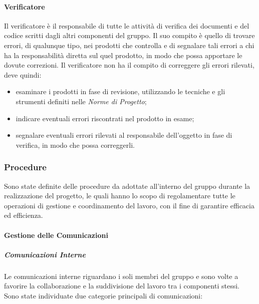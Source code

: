 		\paragraph{Verificatore}
		
			Il verificatore è il responsabile di tutte le attività di verifica dei documenti e del codice scritti dagli altri componenti del gruppo. Il suo compito è quello di trovare errori, di qualunque tipo, nei prodotti che controlla e di segnalare tali errori a chi ha la responsabilità diretta sul quel prodotto, in modo che possa apportare le dovute correzioni.
			\newline
			Il verificatore non ha il compito di correggere gli errori rilevati, deve quindi:
			
			\begin{itemize}
				\item esaminare i prodotti in fase di revisione, utilizzando le tecniche e gli strumenti definiti nelle \textit{Norme di Progetto};
				\item indicare eventuali errori riscontrati nel prodotto in esame;
				\item segnalare eventuali errori rilevati al responsabile dell'oggetto in fase di verifica, in modo che possa correggerli.
			\end{itemize}	
	
	\subsubsection{Procedure}
		
		Sono state definite delle procedure da adottate all'interno del gruppo durante la realizzazione del progetto, le quali hanno lo scopo di regolamentare tutte le operazioni di gestione e coordinamento del lavoro, con il fine di garantire efficacia ed efficienza.
		
		\paragraph{Gestione delle Comunicazioni}
		
			\subparagraph{Comunicazioni Interne}
			
				Le comunicazioni interne riguardano i soli membri del gruppo e sono volte a favorire la collaborazione e la suddivisione del lavoro tra i componenti stessi.
				\newline
				Sono state individuate due categorie principali di comunicazioni:
				

